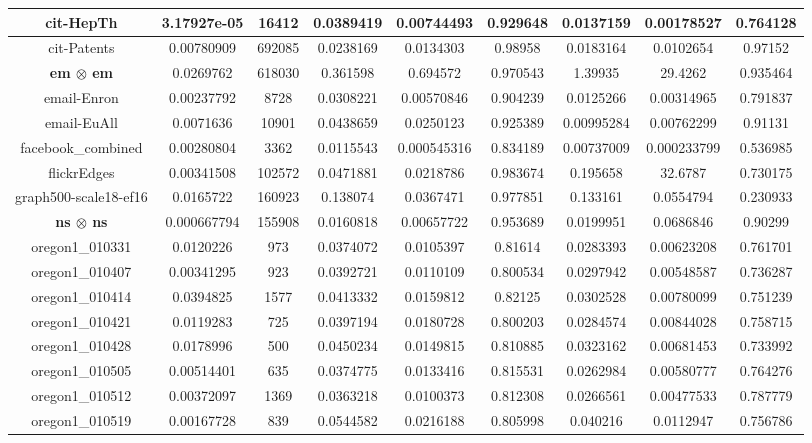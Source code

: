 \documentclass[10]{report}
\begin{document}
\begin{table}
{\begin{tabular}{|c|c|c|c|c|c|c|c|c|}
\hline
cit-HepTh&3.17927e-05 & 16412 & 0.0389419 & 0.00744493 & 0.929648 & 0.0137159 & 0.00178527 & 0.764128 \\
\hline
cit-Patents&0.00780909 & 692085 & 0.0238169 & 0.0134303 & 0.98958 & 0.0183164 & 0.0102654 & 0.97152 \\
\hline
\textbf{em $\boldsymbol{\otimes}$ em}&0.0269762 & 618030 & 0.361598 & 0.694572 & 0.970543 & 1.39935 & 29.4262 & 0.935464 \\
\hline
email-Enron&0.00237792 & 8728 & 0.0308221 & 0.00570846 & 0.904239 & 0.0125266 & 0.00314965 & 0.791837 \\
\hline
email-EuAll&0.0071636 & 10901 & 0.0438659 & 0.0250123 & 0.925389 & 0.00995284 & 0.00762299 & 0.91131 \\
\hline
facebook\_combined&0.00280804 & 3362 & 0.0115543 & 0.000545316 & 0.834189 & 0.00737009 & 0.000233799 & 0.536985 \\
\hline
flickrEdges&0.00341508 & 102572 & 0.0471881 & 0.0218786 & 0.983674 & 0.195658 & 32.6787 & 0.730175 \\
\hline
graph500-scale18-ef16&0.0165722 & 160923 & 0.138074 & 0.0367471 & 0.977851 & 0.133161 & 0.0554794 & 0.230933 \\
\hline
\textbf{ns $\boldsymbol{\otimes}$ ns}&0.000667794 & 155908 & 0.0160818 & 0.00657722 & 0.953689 & 0.0199951 & 0.0686846 & 0.90299 \\
\hline
oregon1\_010331&0.0120226 & 973 & 0.0374072 & 0.0105397 & 0.81614 & 0.0283393 & 0.00623208 & 0.761701 \\
\hline
oregon1\_010407&0.00341295 & 923 & 0.0392721 & 0.0110109 & 0.800534 & 0.0297942 & 0.00548587 & 0.736287 \\
\hline
oregon1\_010414&0.0394825 & 1577 & 0.0413332 & 0.0159812 & 0.82125 & 0.0302528 & 0.00780099 & 0.751239 \\
\hline
oregon1\_010421&0.0119283 & 725 & 0.0397194 & 0.0180728 & 0.800203 & 0.0284574 & 0.00844028 & 0.758715 \\
\hline
oregon1\_010428&0.0178996 & 500 & 0.0450234 & 0.0149815 & 0.810885 & 0.0323162 & 0.00681453 & 0.733992 \\
\hline
oregon1\_010505&0.00514401 & 635 & 0.0374775 & 0.0133416 & 0.815531 & 0.0262984 & 0.00580777 & 0.764276 \\
\hline
oregon1\_010512&0.00372097 & 1369 & 0.0363218 & 0.0100373 & 0.812308 & 0.0266561 & 0.00477533 & 0.787779 \\
\hline
oregon1\_010519&0.00167728 & 839 & 0.0544582 & 0.0216188 & 0.805998 & 0.040216 & 0.0112947 & 0.756786 \\

\end{tabular}}
\end{table}
\end{document}
